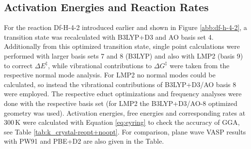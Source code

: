 \documentclass[11pt,DIV=13,BCOR=5mm,a4paper,headinclude]{scrbook}
\begin{document}
\subsection{Activation Energies and Reaction Rates}\label{crystal-rate}
For the reaction Df-H-4-2 introduced earlier and shown in Figure \ref{abb:df-h-4-2}, a transition state was recalculated with B3LYP+D3 and AO basis set 4.
Additionally from this optimized transition state, single point calculations were performed with larger basis sets 7 and 8 (B3LYP) and also with LMP2 (basis 9) to correct $\Delta E^\ddagger$, while vibrational contributions to $\Delta G^\ddagger$ were taken from the respective normal mode analysis.
For LMP2 no normal modes could be calculated, so instead the vibrational contributions of B3LYP+D3/AO basis 8 were employed.
The respective educt optimizations and frequency analyses were done with the respective basis set (for LMP2 the B3LYP+D3/AO-8 optimized geometry was used).
Activation energies, free energies and corresponding rates at $300\,$K were calculated with Equation \ref{eq:eyring} to check the accuracy of GGA, see Table \ref{tab:k_crystal-reopt+noopt}.
For comparison, plane wave VASP results with PW91 and PBE+D2 are also given in the Table.
\end{document}
